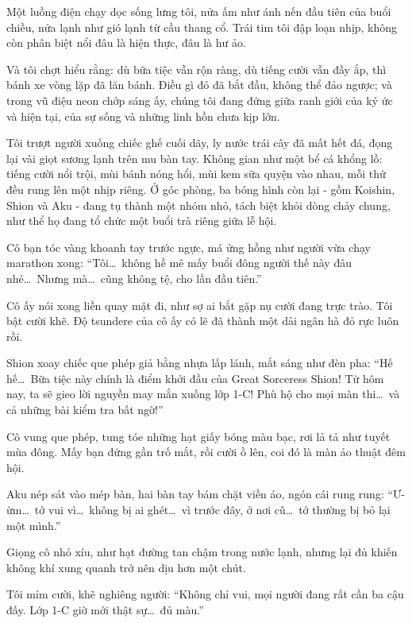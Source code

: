 \documentclass[../main.tex]{subfiles}
\begin{document}
Một luồng điện chạy dọc sống lưng tôi, nửa ấm như ánh nến đầu tiên của buổi chiều, nửa lạnh như gió lạnh từ cầu thang cổ. Trái tim tôi đập loạn nhịp, không còn phân biệt nổi đâu là hiện thực, đâu là hư ảo.

Và tôi chợt hiểu rằng: dù bữa tiệc vẫn rộn ràng, dù tiếng cười vẫn đầy ắp, thì bánh xe vòng lặp đã lăn bánh. Điều gì đó đã bắt đầu, không thể đảo ngược; và trong vũ điệu neon chớp sáng ấy, chúng tôi đang đứng giữa ranh giới của ký ức và hiện tại, của sự sống và những linh hồn chưa kịp lớn.

\ct

Tôi trượt người xuống chiếc ghế cuối dãy, ly nước trái cây đã mất hết đá, đọng lại vài giọt sương lạnh trên mu bàn tay. Không gian như một bể cá khổng lồ: tiếng cười nổi trội, mùi bánh nóng hổi, mùi kem sữa quyện vào nhau, mỗi thứ đều rung lên một nhịp riêng. Ở góc phòng, ba bóng hình còn lại - gồm Koishin, Shion và Aku - đang tụ thành một nhóm nhỏ, tách biệt khỏi dòng chảy chung, như thể họ đang tổ chức một buổi trà riêng giữa lễ hội.

Cô bạn tóc vàng khoanh tay trước ngực, má ửng hồng như người vừa chạy marathon xong: ``Tôi\dots\ không hề mê mấy buổi đông người thế này đâu nhé\dots\ Nhưng mà\dots\ cũng không tệ, cho lần đầu tiên.''

Cô ấy nói xong liền quay mặt đi, như sợ ai bắt gặp nụ cười đang trực trào. Tôi bật cười khẽ. Độ tsundere của cô ấy có lẽ đã thành một dải ngân hà đỏ rực luôn rồi.

Shion xoay chiếc que phép giả bằng nhựa lấp lánh, mắt sáng như đèn pha: ``Hế hế\dots\ Bữa tiệc này chính là điểm khởi đầu của Great Sorceress Shion! Từ hôm nay, ta sẽ gieo lời nguyền may mắn xuống lớp 1-C! Phù hộ cho mọi màn thi\dots\ và cả những bài kiểm tra bất ngờ!''

Cô vung que phép, tung tóe những hạt giấy bóng màu bạc, rơi lả tả như tuyết mùa đông. Mấy bạn đứng gần trố mắt, rồi cười ồ lên, coi đó là màn ảo thuật đêm hội.

Aku nép sát vào mép bàn, hai bàn tay bám chặt viền áo, ngón cái rung rung: ``Ư-ừm\dots\ tớ vui vì\dots\ không bị ai ghét\dots\ vì trước đây, ở nơi cũ\dots\ tớ thường bị bỏ lại một mình.''

Giọng cô nhỏ xíu, như hạt đường tan chậm trong nước lạnh, nhưng lại đủ khiến không khí xung quanh trở nên dịu hơn một chút.

Tôi mỉm cười, khẽ nghiêng người: ``Không chỉ vui, mọi người đang rất cần ba cậu đấy. Lớp 1-C giờ mới thật sự\dots\ đủ màu.''
\end{document}
